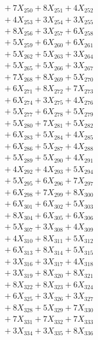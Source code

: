 \documentclass[a4paper,10pt]{article}
\begin{document}
{\begin{align}
&\;  + 7 X_{250} + 8 X_{251} + 4 X_{252} \\[0.3ex]
&\;  + 4 X_{253} + 3 X_{254} + 3 X_{255} \\[0.3ex]
&\;  + 8 X_{256} + 3 X_{257} + 6 X_{258} \\[0.3ex]
&\;  + 5 X_{259} + 6 X_{260} + 6 X_{261} \\[0.3ex]
&\;  + 5 X_{262} + 5 X_{263} + 3 X_{264} \\[0.3ex]
&\;  + 5 X_{265} + 5 X_{266} + 3 X_{267} \\[0.3ex]
&\;  + 7 X_{268} + 8 X_{269} + 5 X_{270} \\[0.3ex]
&\;  + 6 X_{271} + 8 X_{272} + 7 X_{273} \\[0.3ex]
&\;  + 6 X_{274} + 3 X_{275} + 4 X_{276} \\[0.3ex]
&\;  + 5 X_{277} + 6 X_{278} + 5 X_{279} \\[0.5ex]\allowbreak
&\;  + 5 X_{280} + 7 X_{281} + 5 X_{282} \\[0.3ex]
&\;  + 6 X_{283} + 5 X_{284} + 4 X_{285} \\[0.3ex]
&\;  + 6 X_{286} + 5 X_{287} + 4 X_{288} \\[0.3ex]
&\;  + 5 X_{289} + 5 X_{290} + 4 X_{291} \\[0.3ex]
&\;  + 4 X_{292} + 4 X_{293} + 5 X_{294} \\[0.3ex]
&\;  + 5 X_{295} + 6 X_{296} + 7 X_{297} \\[0.3ex]
&\;  + 6 X_{298} + 7 X_{299} + 8 X_{300} \\[0.3ex]
&\;  + 6 X_{301} + 6 X_{302} + 5 X_{303} \\[0.3ex]
&\;  + 8 X_{304} + 6 X_{305} + 6 X_{306} \\[0.3ex]
&\;  + 5 X_{307} + 3 X_{308} + 4 X_{309} \\[0.5ex]\allowbreak
&\;  + 4 X_{310} + 8 X_{311} + 5 X_{312} \\[0.3ex]
&\;  + 6 X_{313} + 8 X_{314} + 5 X_{315} \\[0.3ex]
&\;  + 3 X_{316} + 3 X_{317} + 4 X_{318} \\[0.3ex]
&\;  + 3 X_{319} + 8 X_{320} + 8 X_{321} \\[0.3ex]
&\;  + 8 X_{322} + 8 X_{323} + 6 X_{324} \\[0.3ex]
&\;  + 6 X_{325} + 3 X_{326} + 3 X_{327} \\[0.3ex]
&\;  + 8 X_{328} + 5 X_{329} + 7 X_{330} \\[0.3ex]
&\;  + 7 X_{331} + 7 X_{332} + 7 X_{333} \\[0.3ex]
&\;  + 3 X_{334} + 3 X_{335} + 8 X_{336} \\[0.3ex]

\end{align}}
\end{document}
